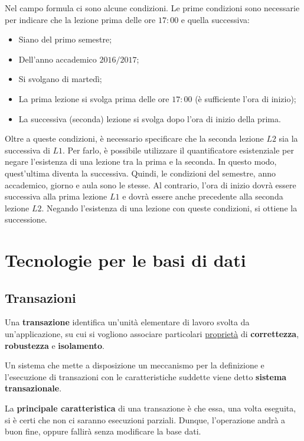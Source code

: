 \documentclass[a4paper]{article}
\begin{document}
	\noindent
	Nel campo formula ci sono alcune condizioni. Le prime condizioni sono necessarie per indicare che la lezione prima delle ore $17:00$ e quella successiva:
	\begin{itemize}
		\item Siano del primo semestre;
		\item Dell'anno accademico $2016/2017$;
		\item Si svolgano di martedì;
		\item La prima lezione si svolga prima delle ore $17:00$ (è sufficiente l'ora di inizio);
		\item La successiva (seconda) lezione si svolga dopo l'ora di inizio della prima.
	\end{itemize}
	Oltre a queste condizioni, è necessario specificare che la seconda lezione $L2$ sia la successiva di $L1$. Per farlo, è possibile utilizzare il quantificatore esistenziale per negare l'esistenza di una lezione tra la prima e la seconda. In questo modo, quest'ultima diventa la successiva. Quindi, le condizioni del semestre, anno accademico, giorno e aula sono le stesse. Al contrario, l'ora di inizio dovrà essere successiva alla prima lezione $L1$ e dovrà essere anche precedente alla seconda lezione $L2$. Negando l'esistenza di una lezione con queste condizioni, si ottiene la successione.\newpage
	
	\section{Tecnologie per le basi di dati}
	
	\subsection{Transazioni}
	
	Una \textcolor{Red3}{\textbf{transazione}} identifica un'unità elementare di lavoro svolta da un'applicazione, su cui si vogliono associare particolari \underline{proprietà} di \textbf{correttezza}, \textbf{robustezza} e \textbf{isolamento}.\newline
	
	\noindent
	Un sistema che mette a disposizione un meccanismo per la definizione e l'esecuzione di transazioni con le caratteristiche suddette viene detto \textbf{sistema transazionale}.\newline
	
	\noindent
	La \textbf{principale caratteristica} di una transazione è che essa, una volta eseguita, si è certi che non ci saranno esecuzioni parziali. Dunque, l'operazione andrà a buon fine, oppure fallirà senza modificare la base dati.
	
\end{document}
